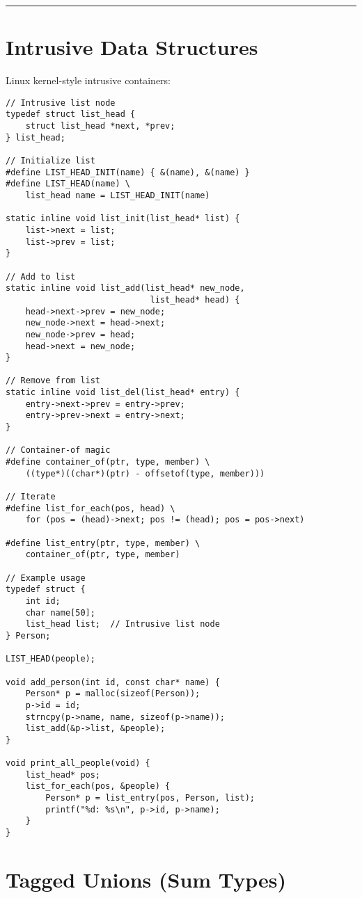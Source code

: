 \begin{description}[style=nextline,leftmargin=0pt]
\vspace{0.5cm}
\noindent\rule{\textwidth}{0.4pt}

\section{Intrusive Data Structures}

Linux kernel-style intrusive containers:

\begin{lstlisting}
// Intrusive list node
typedef struct list_head {
    struct list_head *next, *prev;
} list_head;

// Initialize list
#define LIST_HEAD_INIT(name) { &(name), &(name) }
#define LIST_HEAD(name) \
    list_head name = LIST_HEAD_INIT(name)

static inline void list_init(list_head* list) {
    list->next = list;
    list->prev = list;
}

// Add to list
static inline void list_add(list_head* new_node,
                             list_head* head) {
    head->next->prev = new_node;
    new_node->next = head->next;
    new_node->prev = head;
    head->next = new_node;
}

// Remove from list
static inline void list_del(list_head* entry) {
    entry->next->prev = entry->prev;
    entry->prev->next = entry->next;
}

// Container-of magic
#define container_of(ptr, type, member) \
    ((type*)((char*)(ptr) - offsetof(type, member)))

// Iterate
#define list_for_each(pos, head) \
    for (pos = (head)->next; pos != (head); pos = pos->next)

#define list_entry(ptr, type, member) \
    container_of(ptr, type, member)

// Example usage
typedef struct {
    int id;
    char name[50];
    list_head list;  // Intrusive list node
} Person;

LIST_HEAD(people);

void add_person(int id, const char* name) {
    Person* p = malloc(sizeof(Person));
    p->id = id;
    strncpy(p->name, name, sizeof(p->name));
    list_add(&p->list, &people);
}

void print_all_people(void) {
    list_head* pos;
    list_for_each(pos, &people) {
        Person* p = list_entry(pos, Person, list);
        printf("%d: %s\n", p->id, p->name);
    }
}
\end{lstlisting}

\section{Tagged Unions (Sum Types)}


\end{description}
